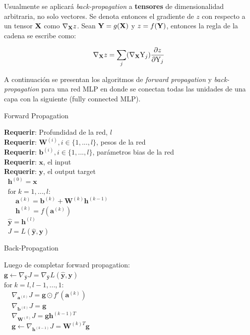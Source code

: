 Usualmente se aplicar\'a \textit{back-propagation} a \textbf{tensores} de dimensionalidad arbitraria, no solo vectores. Se denota entonces el gradiente de $z$ con respecto a un tensor $\textrm{\textbf{X}}$ como $\nabla_{\textrm{\textbf{X}}}z$. Sean $\textrm{\textbf{Y}} = g(\textrm{\textbf{X}})$ y $z = f(\textrm{\textbf{Y}})$, entonces la regla de la cadena se escribe como:

\begin{equation}
\nabla_{\textrm{\textbf{X}}}z = \sum_{j}(\nabla_{\textrm{\textbf{X}}}\textrm{Y}_{j})\frac{\partial z}{\partial \textrm{Y}_{j}}
\end{equation}

A continuaci\'on se presentan los algoritmos de \textit{forward propagation} y \textit{back-propagation} para una red MLP en donde se conectan todas las unidades de una capa con la siguiente (fully connected MLP).

\begin{algorithm}[H] %
\caption{Forward Propagation}\label{ML:Algorithm1}
\textbf{Requerir}: Profundidad de la red, $l$ \\
\textbf{Requerir}: $\bm{W}^{(i)}, i \in \{1,...,l\}$, pesos de la red \\
\textbf{Requerir}: $\bm{b}^{(i)}, i \in \{1,...,l\}$, parámetros bias de la red \\
\textbf{Requerir}: $\bm{x}$, el input \\
\textbf{Requerir}: $\bm{y}$, el output target \\
$\;\;\bm{h}^{(0)} = \bm{x}$\\
$\;\; \textrm{for} \;k = 1,...,l$:\\
$\;\;\;\;\;\;\bm{a}^{(k)} = \bm{b}^{(k)} + \bm{W}^{(k)}\bm{h}^{(k-1)}$\\
$\;\;\;\;\;\;\bm{h}^{(k)} = f(\bm{a}^{(k)})$\\
$\;\;\bm{\hat{y}} = \bm{h}^{(l)}$\\
$\;\;J = L(\bm{\hat{y}},\bm{y})$
\end{algorithm}

\begin{algorithm}[H] %
\caption{Back-Propagation}\label{ML:Algorithm2}
Luego de completar forward propagation: \\
$\bm{g} \leftarrow \nabla_{\bm{\hat{y}}} J = \nabla_{\bm{\hat{y}}} L(\bm{\hat{y}},\bm{y})$\\
$\textrm{for} \;k = l,l-1,...,1:$\\
$\;\;\;\;\nabla_{\bm{a}^{(k)}} J = \bm{g}\odot f'(\bm{a}^{(k)})$\\
$\;\;\;\;\nabla_{\bm{b}^{(k)}} J = \bm{g}$\\
$\;\;\;\;\nabla_{\bm{W}^{(k)}} J = \bm{g}\bm{h}^{(k-1)T}$\\
$\;\;\;\;\bm{g} \leftarrow \nabla_{\bm{h}^{(k-1)}} J = \bm{W}^{(k)T}\bm{g}$
\end{algorithm}

